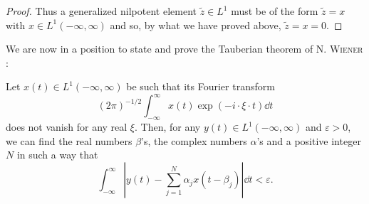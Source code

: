 \begin{proof}
Thus a generalized nilpotent element $\tilde{z} \in L^1$ must be of the form $\tilde{z} = x$ with $x \in L^1(-\infty, \infty)$ and so, by what we have proved above, $\tilde{z} = x = 0$. 
\end{proof}

We are now in a position to state and prove the Tauberian theorem of N. \textsc{Wiener} \cite{wiener340}: 

\begin{theorem}\label{thm:XI.16.Theorem.3} Let $x(t) \in L^{1}(-\infty, \infty)$ be such that its Fourier transform 
\[
(2 \pi) ^{-1/2} \int_{- \infty} ^{\infty} x (t) \exp (- i \cdot \xi \cdot t) \dd t
\]
does not vanish for any real $\xi$. Then, for any $y(t) \in L^{1}(-\infty, \infty)$ and $\varepsilon > 0$, we can find the real numbers $\beta$'s, the complex numbers $\alpha$'s and a positive integer $N$ in such a way that 
\begin{equation}\label{eq:XI.16.16}
\int_{- \infty} ^{\infty} \left| y (t) - \sum\limits_{j=1} ^{N} \alpha_{j} x (t - \beta_{j}) \right| \dd t < \varepsilon .
\end{equation}
\end{theorem}


